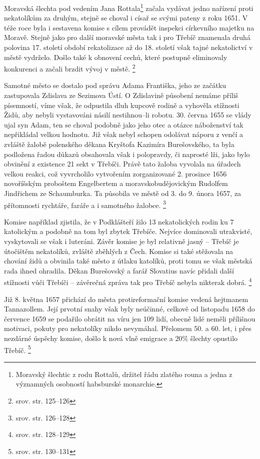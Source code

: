 \documentclass[a4paper,oneside,12pt]{report}
\begin{document}
Moravská šlechta pod vedením Jana Rottala\footnote{Moravský šlechtic z rodu Rottalů, držitel řádu zlatého rouna a jedna z významných osobností habsburské monarchie.} začala vydávat jedno nařízení proti nekatolíkům za druhým, stejně se choval i císař se svými pateny z roku 1651.
V téže roce byla i sestavena komise s cílem provádět inspekci církevního majetku na Moravě.
Stejně jako pro další moravské města tak i pro Třebíč znamenala druhá polovina 17. století období rekatolizace až do 18. století však tajné nekatolictví v městě vydrželo.
Došlo také k obnovení cechů, které postupně eliminovaly konkurenci a začali brzdit vývoj v městě. \footnote{srov. \cite{Uhlir1978} str. 125--126}

Samotné město se dostalo pod správu Adama Františka, jeho ze začátku zastupovala Zdislava ze Sezimova Ústí.
O Zdislavině působení nemáme příliš písemností, víme však, že odpustila dluh kupcově rodině a vyhověla stížnosti Židů, aby nebyli vystavováni násilí nestihnou--li robotu.
30. června 1655 se vlády ujal syn Adam, ten se choval podobně jako jeho otec a otázce náboženství tak nepřikládal velkou hodnotu.
Již však nebyl schopen odolávat náporu z venčí a zvláště žalobě polenského děkana Kryštofa Kazimíra Burešovského, ta byla podložena řadou důkazů obsahovala však i polopravdy, či naprosté lži, jako bylo obvinění z existence 21 sekt v Třebíči.
Právě tato žaloba vyvolala na úřadech velkou reakci, což vyvrcholilo vytvořením  zorganizované 2. prosince 1656 novoříšským proboštem Engelbertem a moravskobudějovickým Rudolfem Jindřichem ze Schaumburka.
Ta působila ve městě od 3. do 9. února 1657, za přítomnosti rychtáře, faráře a i samotného žalobce. \footnote{srov. \cite{Uhlir1978} str. 126--128}

Komise například zjistila, že v Podklášteří žilo 13 nekatolických rodin ku 7 katolickým a podobně na tom byl zbytek Třebíče.
Nejvíce dominovali utrakvisté, vyskytovali se však i luteráni.
Závěr komise je byl relativně jasný -- Třebíč je útočištěm nekatolíků, zvláště zběhlých z Čech.
Komise si také stěžovala na chování židů a obvinila také město z útlaku katolíků, proti tomu se však městská rada ihned ohradila.
Děkan Burešovský a farář Slovatius navíc přidali další stížnosti vůči Třebíči -- závěrečná zpráva tak pro Třebíč nebyla nikterak dobrá.  \footnote{srov. \cite{Uhlir1978} str. 128--129}

Již 8. května 1657 přichází do města protireformační komise vedená hejtmanem Tannazollem.
Její prvotní snahy však byly neúčinné, celkově od listopadu 1658 do července 1659 se podařilo obrátit na  víru jen 109 lidí, obecně lidé neměli přílišnou motivaci, pokuty pro nekatolíky nikdo nevymáhal.
Přelomem 50. a 60. let, i přes nezdárné úspěchy komise, došlo k nová vlně emigrace a 20\% šlechty opustilo Třebíč. \footnote{srov. \cite{Uhlir1978} str. 130--131}
\end{document}
